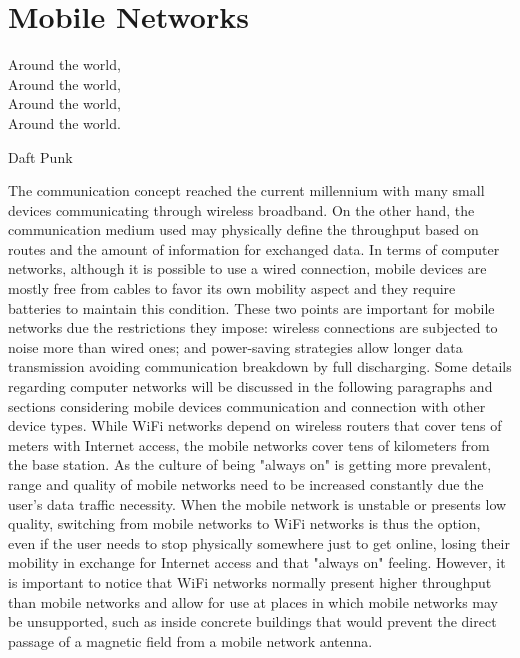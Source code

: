 \chapter{Mobile Networks}
\label{cap:mobilenetworks}

 \epigraph{
 Around the world,\\
 Around the world,\\
 Around the world,\\
 Around the world.}
 {Daft Punk}

The communication concept reached the current millennium with many small devices communicating through wireless broadband.
On the other hand, the communication medium used may physically define the throughput based on routes and the amount of information for exchanged data.
In terms of computer networks, although it is possible to use a wired connection, mobile devices are mostly free from cables to favor its own mobility aspect and they require batteries to maintain this condition.
These two points are important for mobile networks due the restrictions they impose:
wireless connections are subjected to noise more than wired ones; and power-saving strategies allow longer data transmission avoiding communication breakdown by full discharging.
Some details regarding computer networks will be discussed in the following paragraphs and sections considering mobile devices communication and connection with other device types. 
While WiFi networks depend on wireless routers that cover tens of meters with Internet access, the mobile networks cover tens of kilometers from the base station.
As the culture of being "always on" is getting more prevalent, range and quality of mobile networks need to be increased constantly due the user's data traffic necessity.
When the mobile network is unstable or presents low quality, switching from mobile networks to WiFi networks is thus the option, even if the user needs to stop physically somewhere just to get online, losing their mobility in exchange for Internet access and that "always on" feeling.
However, it is important to notice that WiFi networks normally present higher throughput than mobile networks and allow for use at places in which mobile networks may be unsupported, such as inside concrete buildings that would prevent the direct passage of a magnetic field from a mobile network antenna.

